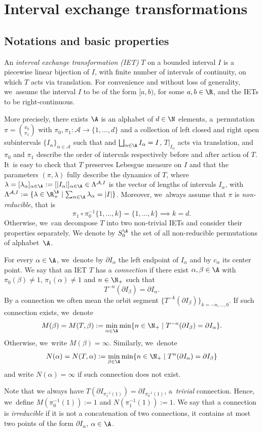 \section{Interval exchange transformations}
\label{sc:IETs}

\subsection{Notations and basic properties} An \emph{interval exchange transformation (IET)} $T$ on a bounded interval $I$ is a piecewise linear bijection of $I$, with finite number of intervals of continuity, on which $T$ acts via translation. {For convenience and without loss of generality, we~assume the interval $I$ to be of the form $[a, b)$, for some $a, b \in \R$, and the IETs to be right-continuous.}

More precisely, there exists $\A$ is an alphabet of $d\in\N$ elements, a~permutation $\pi=\binom{\pi_0}{\pi_1}$ with $\pi_0,\pi_1:\mathcal A\to\{1,\ldots,d\}$ and a collection of left closed and right open subintervals $\{I_{\alpha}\}_{\alpha\in\mathcal A}$ such that and $\bigsqcup_{\alpha\in\A} I_{\alpha}=I$, $T|_{I_{\alpha}}$ acts via translation, and $\pi_0$ and $\pi_1$ describe the order of intervals respectively before and after
action of $T$. It~is easy to check that $T$ preserves Lebesgue measure on $I$ and that the parameters $(\pi,\lambda)$ fully describe the dynamics of $T$, where $\lambda=[\lambda_\alpha]_{\alpha\in\A}:=[|I_{\alpha}|]_{\alpha\in\A}\in \Lambda^{\mathcal A,I}$ is the vector of lengths of intervals $I_{\alpha}$, with $\Lambda^{\mathcal A,I}:=\{\lambda\in\R^{\A}_{+}\mid \sum_{\alpha\in\A}\lambda_{\alpha}=|I|\}$. {Moreover, we~always assume that $\pi$ is \emph{non-reducible}, that is
\[
\pi_1\circ\pi^{-1}_0\{1,\ldots,k\}=\{1,\ldots,k\}\implies k=d.
\]
Otherwise, we~can decompose $T$ into two non-trivial IETs and consider their properties separately. We denote by $S_0^{\A}$ the set of all non-reducible permutations of alphabet~$\A$.
}

For every $\alpha\in\A$, we~denote by $\partial I_{\alpha}$ the left endpoint of $I_{\alpha}$ and by $c_{\alpha}$ its center point. We say that an IET $T$ has a \emph{connection} if there exist $\alpha,\beta\in\A$ with $\pi_0(\beta)\neq 1$, $\pi_1(\alpha)\neq 1$ and $n\in\N_+$ such that
\[
T^{-n}(\partial I_\beta)=\partial I_{\alpha}.
\]
By a connection we often mean the orbit segment $\{T^{-k}(\partial I_\beta)\}_{k=-n,\ldots,0}$.
If such connection exists, we~denote
\[
M(\beta)=M(T,\beta):=\min_{\alpha\in\A}\min\{n\in\N_+\mid T^{-n}(\partial I_\beta)=\partial I_{\alpha}\}.
\]
Otherwise, we~write $M(\beta)=\infty$. Similarly, we~denote
\[
N(\alpha)=N(T,\alpha):=\min_{\beta\in\A}\min\{n\in\N_+\mid T^{n}(\partial I_\alpha)=\partial I_{\beta}\}
\]
and write $N(\alpha)=\infty$ if such connection does not exist. {Note that we always have $T(\partial I_{\pi_1^{-1}(1)})=\partial I_{\pi_0^{-1}(1)}$, a~\emph{trivial} connection. Hence, we~define $M(\pi_0^{-1}(1)):=1$ and $N(\pi_1^{-1}(1)):=1$. {We say that a connection is \emph{irreducible} if it is not a concatenation of two connections, \ie it contains at most two points of the form $\partial I_{\alpha}$, $\alpha\in\A$}.

}

